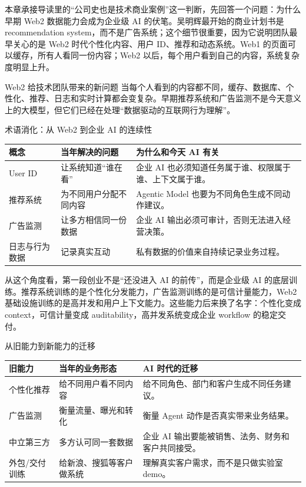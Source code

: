 \documentclass[a4paper]{article}
\begin{document}
本章承接导读里的“公司史也是技术商业案例”这一判断，先回答一个问题：为什么早期 Web2 数据能力会成为企业级 AI 的伏笔。吴明辉最开始的商业计划书是 recommendation system，而不是广告系统；这个细节很重要，因为它说明团队最早关心的是 Web2 时代个性化内容、用户 ID、推荐和动态系统。Web1 的页面可以缓存，所有人看同一份内容；Web2 以后，每个用户看到自己的内容，系统复杂度明显上升。

\begin{importantbox}{Web2 给技术团队带来的新问题}
当每个人看到的内容都不同，缓存、数据库、个性化、推荐、日志和实时计算都会变复杂。早期推荐系统和广告监测不是今天意义上的大模型，但它们已经在处理“数据驱动的互联网行为理解”。
\end{importantbox}

\begin{knowledgebox}{术语消化：从 Web2 到企业 AI 的连续性}
\begin{tabularx}{\textwidth}{p{}p{}X}
\toprule
概念 & 当年解决的问题 & 为什么和今天 AI 有关 \\
\midrule
User ID & 让系统知道“谁在看” & 企业 AI 也必须知道任务属于谁、权限属于谁、上下文属于谁。 \\
推荐系统 & 为不同用户分配不同内容 & Agentic Model 也要为不同角色生成不同动作建议。 \\
广告监测 & 让多方相信同一份数据 & 企业 AI 输出必须可审计，否则无法进入经营决策。 \\
日志与行为数据 & 记录真实互动 & 私有数据的价值来自持续记录业务过程。 \\
\bottomrule
\end{tabularx}
\end{knowledgebox}

从这个角度看，第一段创业不是“还没进入 AI 的前传”，而是企业级 AI 的底层训练。推荐系统训练的是个性化分发能力，广告监测训练的是可信计量能力，Web2 基础设施训练的是高并发和用户上下文能力。这些能力后来换了名字：个性化变成 context，可信计量变成 auditability，高并发系统变成企业 workflow 的稳定交付。

\begin{knowledgebox}{从旧能力到新能力的迁移}
\begin{tabularx}{\textwidth}{p{}p{}X}
\toprule
旧能力 & 当年的业务形态 & AI 时代的迁移 \\
\midrule
个性化推荐 & 给不同用户看不同内容 & 给不同角色、部门和客户生成不同任务建议。 \\
广告监测 & 衡量流量、曝光和转化 & 衡量 Agent 动作是否真实带来业务结果。 \\
中立第三方 & 多方认可同一套数据 & 企业 AI 输出要能被销售、法务、财务和客户共同接受。 \\
外包/交付训练 & 给新浪、搜狐等客户做系统 & 理解真实客户需求，而不是只做实验室 demo。 \\
\bottomrule
\end{tabularx}
\end{knowledgebox}
\end{document}
